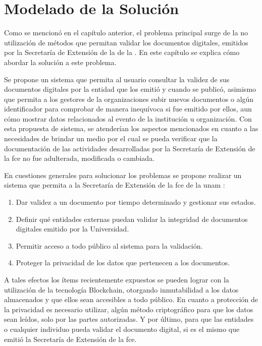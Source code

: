 \chapter{Modelado de la Solución}
Como se mencionó en el capítulo anterior, el problema principal surge de la no utilización
de métodos que permitan validar los documentos digitales, emitidos por la Secretaría de Extensión de la  de la .
En este capítulo se explica cómo abordar la solución a este problema.


Se propone un sistema que permita al usuario consultar la validez  de sus documentos digitales   por la entidad que los emitió
  y cuando se publicó, asimismo que permita a los gestores de la organizaciones subir  nuevos documentos o algún identificador  para comprobar
de manera inequívoca si fue emitido por ellos, aun cómo mostrar datos relacionados al evento de la institución u organización.
Con esta propuesta de sistema, se atenderían los aspectos mencionados en cuanto a las necesidades de brindar un medio por el cual
se pueda verificar que la documentación de las actividades desarrolladas por la  
Secretaría de Extensión de la \gls{fce} no fue adulterada, modificada o cambiada.


En cuestiones generales para solucionar los problemas se propone realizar un sistema que permita a la 
Secretaría de Extensión de la \gls{fce} de la \gls{unam} :

\begin{enumerate}
    \item Dar validez a un documento por tiempo determinado y gestionar sus estados.
    \item Definir qué entidades externas puedan validar la integridad de documentos digitales emitido por la Universidad.
    \item Permitir acceso a todo público al sistema para la validación.
    \item Proteger la privacidad de los datos que pertenecen a los documentos.
\end{enumerate}

A tales efectos los ítems recientemente expuestos se pueden lograr con la utilización de la tecnología Blockchain, 
otorgando inmutabilidad a los datos almacenados y que ellos sean accesibles a todo público.
En cuanto a protección de la privacidad es necesario utilizar, algún método criptográfico 
para que los datos sean leídos,  solo por las partes autorizadas.
Y por último, para que las entidades o cualquier individuo pueda validar el documento digital, si es el mismo
que emitió la Secretaría de Extensión de la \gls{fce}. 

